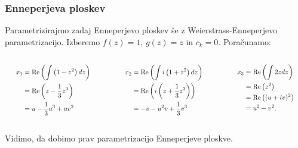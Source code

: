 \documentclass[10pt]{beamer}
\theoremstyle{definition}
\theoremstyle{remark}
\theoremstyle{plain}
\numberwithin{equation}{section}  %
\begin{document}
\begin{frame}
    \frametitle{Enneperjeva ploskev}

    Parametrizirajmo zadaj Enneperjevo ploskev še z Weierstrass-Enneperjevo parametrizacijo. Izberemo $f(z)=1$, $g(z)=z$ in $c_k = 0$. Poračunamo:
    \begin{columns}[t]
        \begin{column}{0.3\textwidth}
            $$
            \scalebox{0.8}{$
            \begin{aligned}
            x_1 &=\operatorname{Re}\left(\int\left(1-z^2\right) d z\right) \\
            &=\operatorname{Re}\left(z-\frac{1}{3} z^3\right) \\
            &=u-\frac{1}{3} u^3+u v^2
            \end{aligned}$}
            $$
        \end{column}

        \begin{column}{0.3\textwidth}
            $$
            \scalebox{0.8}{$
            \begin{aligned}
            x_2 &=\operatorname{Re}\left(\int i\left(1+z^2\right) d z\right) \\
            &=\operatorname{Re}\left(i\left(z+\frac{1}{3} z^3\right)\right) \\
            &=-v-u^2 v+\frac{1}{3} v^3
            \end{aligned}$}
            $$
        \end{column}

        \begin{column}{0.3\textwidth}
            $$
            \scalebox{0.8}{$
            \begin{aligned}
            x_3 &=\operatorname{Re}\left(\int 2 z d z\right) \\
            &=\operatorname{Re}\left(z^2\right) \\
            &= \operatorname{Re}\left((u+i v)^2\right) \\
            &=u^2-v^2 .
            \end{aligned}$}
            $$
        \end{column}

    \end{columns}

    \vspace{3em}

    Vidimo, da dobimo prav parametrizacijo Enneperjeve ploskve.
\end{frame}
\end{document}
